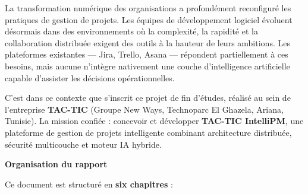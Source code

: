 La transformation numérique des organisations a profondément reconfiguré les pratiques
de gestion de projets. Les équipes de développement logiciel évoluent désormais dans
des environnements où la complexité, la rapidité et la collaboration distribuée exigent
des outils à la hauteur de leurs ambitions. Les plateformes existantes — Jira, Trello,
Asana — répondent partiellement à ces besoins, mais aucune n'intègre nativement une
couche d'intelligence artificielle capable d'assister les décisions opérationnelles.

\bigskip
C'est dans ce contexte que s'inscrit ce projet de fin d'études, réalisé au sein de
l'entreprise \textbf{TAC-TIC} (Groupe New Ways, Technoparc El Ghazela, Ariana,
Tunisie). La mission confiée : concevoir et développer \textbf{TAC-TIC IntelliPM},
une plateforme de gestion de projets intelligente combinant architecture distribuée,
sécurité multicouche et moteur IA hybride.

\bigskip
\noindent\textbf{Organisation du rapport}

\medskip
Ce document est structuré en \textbf{six chapitres} :

